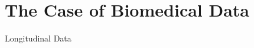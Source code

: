 \documentclass[
  ignorenonframetext,
]{beamer}
\newif\ifbibliography
\begin{document}
\hypertarget{the-case-of-biomedical-data}{%
\section{The Case of Biomedical
Data}\label{the-case-of-biomedical-data}}

\begin{frame}{Longitudinal Data}
\protect\hypertarget{longitudinal-data}{}
\end{frame}


\begin{frame}[allowframebreaks]{}
  \bibliographytrue
  \printbibliography[heading=none]
\end{frame}
\end{document}

